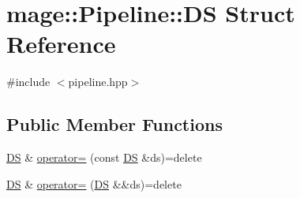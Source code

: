 \hypertarget{structmage_1_1_pipeline_1_1_d_s}{}\section{mage\+:\+:Pipeline\+:\+:DS Struct Reference}
\label{structmage_1_1_pipeline_1_1_d_s}


{\ttfamily \#include $<$pipeline.\+hpp$>$}

\subsection*{Public Member Functions}
\begin{DoxyCompactItemize}
\item 
\hyperlink{structmage_1_1_pipeline_1_1_d_s}{DS} \& \hyperlink{structmage_1_1_pipeline_1_1_d_s_a813f84d465d32ed7202082c292f16906}{operator=} (const \hyperlink{structmage_1_1_pipeline_1_1_d_s}{DS} \&ds)=delete
\item 
\hyperlink{structmage_1_1_pipeline_1_1_d_s}{DS} \& \hyperlink{structmage_1_1_pipeline_1_1_d_s_aac8c805a6c281a1b2849366847f74fdd}{operator=} (\hyperlink{structmage_1_1_pipeline_1_1_d_s}{DS} \&\&ds)=delete
\end{DoxyCompactItemize}
